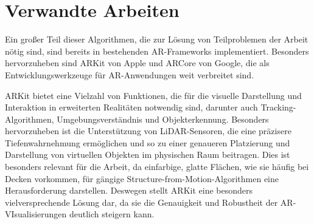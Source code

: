 \section{Verwandte Arbeiten}
\label{sec:related}

Ein gro{\ss}er Teil dieser Algorithmen, die zur L\"osung von Teilproblemen der Arbeit n\"otig sind, sind bereits in bestehenden AR-Frameworks implementiert. Besonders hervorzuheben sind ARKit von Apple und ARCore von Google, die als Entwicklungswerkzeuge f\"ur AR-Anwendungen weit verbreitet sind.

ARKit bietet eine Vielzahl von Funktionen, die f\"ur die visuelle Darstellung und Interaktion in erweiterten Realit\"aten  notwendig sind, darunter auch Tracking-Algorithmen, Umgebungsverst\"andnis und Objekterkennung. Besonders hervorzuheben ist die Unterst\"utzung von LiDAR-Sensoren, die eine pr\"azisere Tiefenwahrnehmung erm\"oglichen und so zu einer genaueren Platzierung und Darstellung von virtuellen Objekten im physischen Raum beitragen. Dies ist besonders relevant f\"ur die Arbeit, da einfarbige, glatte Fl\"achen, wie sie h\"aufig bei Decken vorkommen, f\"ur g\"angige Structure-from-Motion-Algorithmen eine Herausforderung darstellen. Deswegen stellt ARKit eine besonders vielversprechende L\"osung dar, da sie die Genauigkeit und Robustheit der AR-VIsualisierungen deutlich steigern kann.